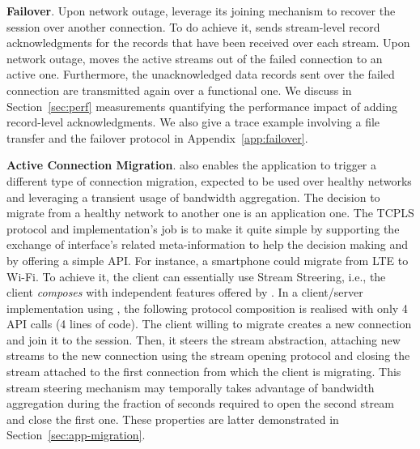 \textbf{Failover}. 
Upon network outage, \tcpls leverage its joining mechanism to recover the session
over another \tcp connection. To do achieve it, \tcpls sends stream-level record
acknowledgments for the records that have been received
over each stream. Upon network outage, \tcpls moves the
active streams out of the failed \tcp connection to an active one. Furthermore,
the unacknowledged data records sent over the failed \tcp connection are
transmitted again over a functional one.
We discuss in Section~\ref{sec:perf} measurements quantifying the
performance impact of adding \tcpls record-level acknowledgments. We also give a
trace example involving a file transfer and the failover protocol in
Appendix~\ref{app:failover}.

\textbf{Active Connection Migration}. \tcpls also enables the application
to trigger a different type of connection migration, expected to be used over
healthy networks and leveraging a transient usage of bandwidth aggregation. The
decision to migrate from a healthy network to another one is an application one.
The TCPLS protocol and implementation's job is to make it quite simple by
supporting the exchange of interface's related meta-information to help the decision
making and by offering a simple API.
For instance, a smartphone could migrate from LTE to Wi-Fi.
To achieve it, the client can essentially use Stream Streering, i.e., the client
\textit{composes} with independent
features offered by \tcpls. In a client/server implementation using \tcpls, the
following protocol composition is realised with only 4 API calls (4 lines of
code). The client willing to migrate creates a new \tcp connection and join it to the \tcpls
session. Then, it steers the \tcpls stream abstraction, attaching new streams to the new
connection using the stream opening protocol and closing the stream attached to
the first connection from which the client is migrating. This stream steering
mechanism may temporally takes advantage of bandwidth aggregation during the
fraction of seconds required to open the second stream and close the first one.
These properties are latter demonstrated in Section~\ref{sec:app-migration}.

